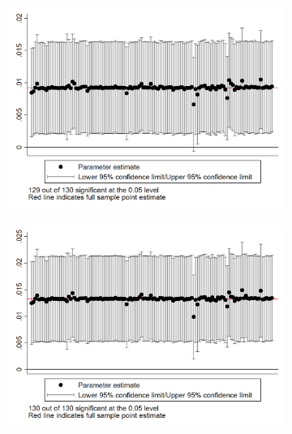 \documentclass{article}
\begin{document}
\begin{figure}[htbp]
    \centering
    \begin{subfigure}{0.3\textwidth}
        \includegraphics[width=\linewidth]{exhibits/figures/exogeneity_tests/loo_iv_cgoodman.png}
        \label{fig:sub1}
    \end{subfigure}
    \begin{subfigure}{0.3\textwidth}
        \includegraphics[width=\linewidth]{exhibits/figures/exogeneity_tests/loo_iv_gen_muni.png}
        \label{fig:sub2}
    \end{subfigure}
    \begin{subfigure}{0.3\textwidth}

\end{subfigure}
\end{figure}
\end{document}
